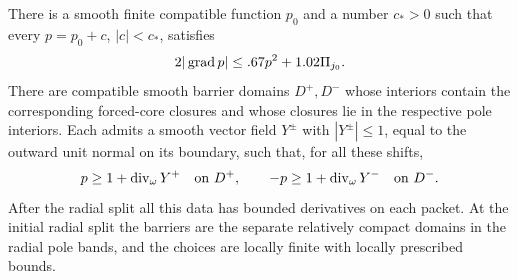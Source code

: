 \begin{lemma}\label{cut:pressure}
There is a smooth finite compatible function $p_0$ and a number $c_*>0$
such that every $p=p_0+c$, $|c|<c_*$, satisfies
\begin{equation}\label{cut:pressure-gradient}
             2|\operatorname{grad} p|\le .67p^2+1.02\Pi_{j_0}.
\end{equation}
There are compatible smooth barrier domains $D^+,D^-$ whose interiors
contain the corresponding forced-core closures and whose closures lie in
the respective pole interiors.  Each admits a smooth vector field $Y^\pm$
with $|Y^\pm|\le1$, equal to the outward unit normal on its boundary, such
that, for all these shifts,
\begin{equation}\label{cut:barrier-pressure}
 p\ge1+\operatorname{div}_\omega Y^+\quad\hbox{on }D^+,
 \qquad
 -p\ge1+\operatorname{div}_\omega Y^-\quad\hbox{on }D^-.
\end{equation}
After the radial split all this data has bounded derivatives on each packet.
At the initial radial split the barriers are the separate relatively
compact domains in the radial pole bands, and the choices are locally
finite with locally prescribed bounds.
\end{lemma}

